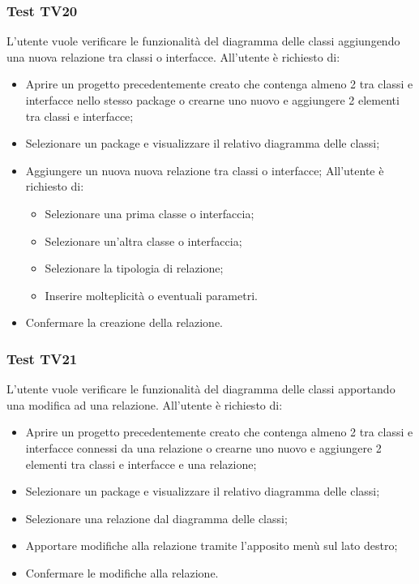 \documentclass[../PianoDiQualifica.tex]{subfiles}
\begin{document}
	\subsubsection{Test TV20} 
	L'utente vuole verificare le funzionalità del diagramma delle classi aggiungendo una nuova relazione tra classi o interfacce. 
	All'utente è richiesto di: 
	\begin{itemize} 
		\item Aprire un progetto precedentemente creato che contenga almeno 2 tra classi e interfacce nello stesso package o crearne uno nuovo e aggiungere 2 elementi tra classi e interfacce;
		\item Selezionare un package e visualizzare il relativo diagramma delle classi; 
		\item Aggiungere un nuova nuova relazione tra classi o interfacce;  
		All'utente è richiesto di: 
		\begin{itemize} 
			\item Selezionare una prima classe o interfaccia; 
			\item Selezionare un'altra classe o interfaccia; 
			\item Selezionare la tipologia di relazione; 
			\item Inserire molteplicità o eventuali parametri. 
		\end{itemize} 
		\item Confermare la creazione della relazione. 
	\end{itemize} 
	
	
	\subsubsection{Test TV21} 
	L'utente vuole verificare le funzionalità del diagramma delle classi apportando una modifica ad una relazione. 
	All'utente è richiesto di: 
	\begin{itemize}  
		\item Aprire un progetto precedentemente creato che contenga almeno 2 tra classi e interfacce connessi da una relazione o crearne uno nuovo e aggiungere 2 elementi tra classi e interfacce e una relazione;
		\item Selezionare un package e visualizzare il relativo diagramma delle classi; 
		\item Selezionare una relazione dal diagramma delle classi; 
		\item Apportare modifiche alla relazione tramite l'apposito menù sul lato destro; 
		\item Confermare le modifiche alla relazione. 
	\end{itemize} 
	
\end{document}
